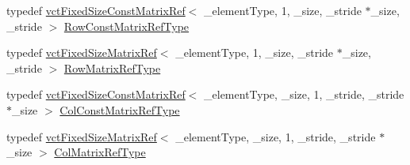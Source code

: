 {\bf }\par
\begin{DoxyCompactItemize}
\item 
typedef \hyperlink{classvct_fixed_size_const_matrix_ref}{vct\+Fixed\+Size\+Const\+Matrix\+Ref}$<$ \+\_\+element\+Type, 1, \+\_\+size, \+\_\+stride $\ast$\+\_\+size, \+\_\+stride $>$ \hyperlink{classvct_fixed_size_const_vector_base_ab7c118dbf79db9194157ced0e4549814}{Row\+Const\+Matrix\+Ref\+Type}
\item 
typedef \hyperlink{classvct_fixed_size_matrix_ref}{vct\+Fixed\+Size\+Matrix\+Ref}$<$ \+\_\+element\+Type, 1, \+\_\+size, \+\_\+stride $\ast$\+\_\+size, \+\_\+stride $>$ \hyperlink{classvct_fixed_size_const_vector_base_a1f9ff7c6b2b3f98c51d1bf3eefdfbd32}{Row\+Matrix\+Ref\+Type}
\end{DoxyCompactItemize}

{\bf }\par
\begin{DoxyCompactItemize}
\item 
typedef \hyperlink{classvct_fixed_size_const_matrix_ref}{vct\+Fixed\+Size\+Const\+Matrix\+Ref}$<$ \+\_\+element\+Type, \+\_\+size, 1, \+\_\+stride, \+\_\+stride $\ast$\+\_\+size $>$ \hyperlink{classvct_fixed_size_const_vector_base_a7dd213f3b90969b8c89fd0766cf0a70e}{Col\+Const\+Matrix\+Ref\+Type}
\item 
typedef \hyperlink{classvct_fixed_size_matrix_ref}{vct\+Fixed\+Size\+Matrix\+Ref}$<$ \+\_\+element\+Type, \+\_\+size, 1, \+\_\+stride, \+\_\+stride $\ast$\+\_\+size $>$ \hyperlink{classvct_fixed_size_const_vector_base_ac2454662f16abd75fdef4ce8d2a00a48}{Col\+Matrix\+Ref\+Type}
\end{DoxyCompactItemize}

